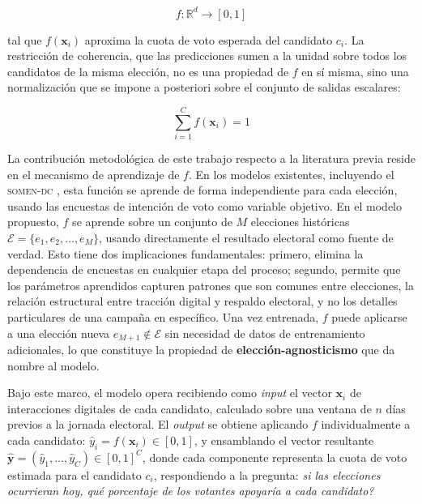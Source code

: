 \begin{equation}
    f: \mathbb{R}^d \rightarrow [0, 1]
    \label{eq:funcion-modelo}
\end{equation}

\noindent tal que $f(\mathbf{x}_i)$ aproxima la cuota de voto esperada
del candidato $c_i$. La restricción de coherencia, que las predicciones
sumen a la unidad sobre todos los candidatos de la misma elección, no
es una propiedad de $f$ en sí misma, sino una normalización que se impone
a posteriori sobre el conjunto de salidas escalares:

\begin{equation}
    \sum_{i=1}^{C} f(\mathbf{x}_i) = 1
    \label{eq:restriccion-suma}
\end{equation}

La contribución metodológica de este trabajo respecto a la literatura
previa reside en el mecanismo de aprendizaje de $f$. En los modelos
existentes, incluyendo el \textsc{somen-dc}
\parencite{brito2023somen}, esta función se aprende de forma
independiente para cada elección, usando las encuestas de intención de
voto como variable objetivo. En el modelo propuesto, $f$ se aprende
sobre un conjunto de $M$ elecciones históricas
$\mathcal{E} = \{e_1, e_2, \ldots, e_M\}$, usando directamente el
resultado electoral como fuente de verdad. Esto tiene dos implicaciones
fundamentales: primero, elimina la dependencia de encuestas en cualquier
etapa del proceso; segundo, permite que los parámetros aprendidos
capturen patrones que son comunes entre elecciones, la relación
estructural entre tracción digital y respaldo electoral, y no los
detalles particulares de una campaña en específico. Una vez entrenada,
$f$ puede aplicarse a una elección nueva $e_{M+1} \notin \mathcal{E}$
sin necesidad de datos de entrenamiento adicionales, lo que constituye
la propiedad de \textbf{elección-agnosticismo} que da nombre al modelo.

Bajo este marco, el modelo opera recibiendo como \textit{input} el
vector $\mathbf{x}_i$ de interacciones digitales de cada candidato,
calculado sobre una ventana de $n$ días previos a la jornada electoral.
El \textit{output} se obtiene aplicando $f$ individualmente a cada candidato:
$\hat{y}_i = f(\mathbf{x}_i) \in [0, 1]$, y ensamblando el vector resultante
$\hat{\mathbf{y}} = (\hat{y}_1, \ldots, \hat{y}_C) \in [0,1]^C$, donde cada
componente representa la cuota de voto estimada para el candidato $c_i$,
respondiendo a la pregunta: \textit{si las elecciones ocurrieran hoy, \textquestiondown{}qué porcentaje de los votantes apoyaría a cada candidato?}

